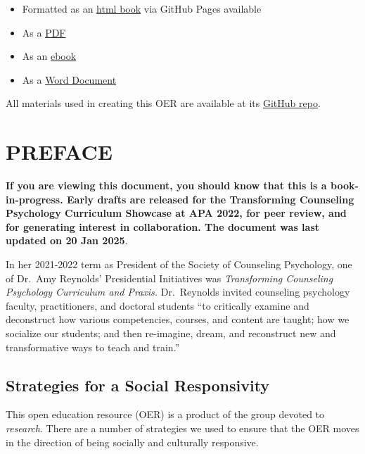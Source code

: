 \documentclass[
  11pt,
]{book}
\providecommand{\tightlist}{%
  \setlength{\itemsep}{0pt}\setlength{\parskip}{0pt}}
\begin{document}
\begin{itemize}
\tightlist
\item
  Formatted as an \href{https://lhbikos.github.io/TransformingResearchMethods/}{html book} via GitHub Pages available
\item
  As a \href{https://github.com/lhbikos/TransformingResearchMethods/blob/main/docs/TransformingResearchMethods.pdf}{PDF}
\item
  As an \href{https://github.com/lhbikos/TransformingResearchMethods/blob/main/docs/TransformingResearchMethods.epub}{ebook}
\item
  As a \href{https://github.com/lhbikos/TransformingResearchMethods/blob/main/docs/TransformingResearchMethods.docx}{Word Document}
\end{itemize}

All materials used in creating this OER are available at its \href{https://github.com/lhbikos/TransformingResearchMethods}{GitHub repo}.

\chapter*{PREFACE}\label{preface}


\textbf{If you are viewing this document, you should know that this is a book-in-progress. Early drafts are released for the Transforming Counseling Psychology Curriculum Showcase at APA 2022, for peer review, and for generating interest in collaboration. The document was last updated on 20 Jan 2025}.

In her 2021-2022 term as President of the Society of Counseling Psychology, one of Dr.~Amy Reynolds' Presidential Initiatives was \emph{Transforming Counseling Psychology Curriculum and Praxis.} Dr.~Reynolds invited counseling psychology faculty, practitioners, and doctoral students ``to critically examine and deconstruct how various competencies, courses, and content are taught; how we socialize our students; and then re-imagine, dream, and reconstruct new and transformative ways to teach and train.''

\section*{Strategies for a Social Responsivity}\label{strategies-for-a-social-responsivity}


This open education resource (OER) is a product of the group devoted to \emph{research}. There are a number of strategies we used to ensure that the OER moves in the direction of being socially and culturally responsive.
\end{document}
